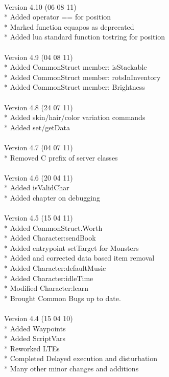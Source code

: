 \documentclass[a4paper,10pt,makeidx]{scrreprt}
\begin{document}
\\
Version 4.10 (06 08 11)\\
* Added operator == for position\\
* Marked function equapos as deprecated\\
* Added lua standard function tostring for position\\
\\
Version 4.9 (04 08 11)\\
* Added CommonStruct member: isStackable\\
* Added CommonStruct member: rotsInInventory\\
* Added CommonStruct member: Brightness\\
\\
Version 4.8 (24 07 11)\\
* Added skin/hair/color variation commands\\
* Added set/getData\\
\\
Version 4.7 (04 07 11)\\
* Removed C prefix of server classes\\
\\
Version 4.6 (20 04 11)\\
* Added isValidChar\\
* Added chapter on debugging\\
\\
Version 4.5 (15 04 11)\\
* Added CommonStruct.Worth\\
* Added Character:sendBook\\
* Added entrypoint setTarget for Monsters\\
* Added and corrected data based item removal\\
* Added Character:defaultMusic\\
* Added Character:idleTime\\
* Modified Character:learn\\
* Brought Common Bugs up to date.\\
\\
Version 4.4 (15 04 10)\\
* Added Waypoints\\
* Added ScriptVars\\
* Reworked LTEs\\
* Completed Delayed execution and disturbation\\
* Many other minor changes and additions\\
\\
\end{document}
